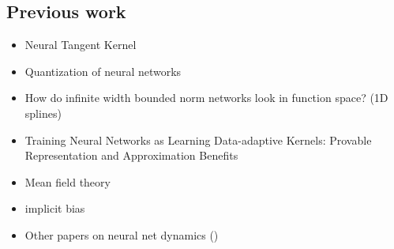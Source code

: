 \subsection{Previous work}
\begin{itemize}
    \item Neural Tangent Kernel
    \item Quantization of neural networks \cite{maennel2018gradient}
    \item How do infinite width bounded norm networks look in
function space? (1D splines) \cite{savarese2019infinite}
    \item Training Neural Networks as Learning Data-adaptive Kernels:
Provable Representation and Approximation Benefits \cite{dou2019training}
    \item Mean field theory
    \item implicit bias
    \item Other papers on neural net dynamics ()
\end{itemize}

